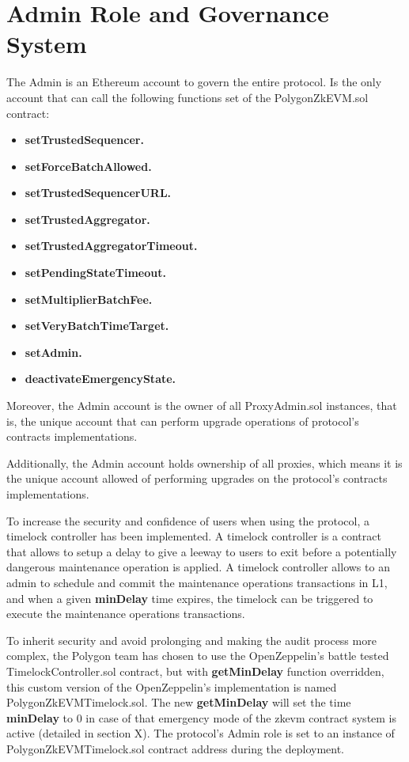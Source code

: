 \section{Admin Role and Governance System}

The Admin is an Ethereum account to govern the entire protocol. Is the only account that can call the following functions set of the PolygonZkEVM.sol contract:

\begin{itemize}
	\item \textbf{setTrustedSequencer.}
	\item \textbf{setForceBatchAllowed.}	
	\item \textbf{setTrustedSequencerURL.}
	\item \textbf{setTrustedAggregator.}
	\item \textbf{setTrustedAggregatorTimeout.}
	\item \textbf{setPendingStateTimeout.}
	\item \textbf{setMultiplierBatchFee.}
	\item \textbf{setVeryBatchTimeTarget.}
	\item \textbf{setAdmin.}
	\item \textbf{deactivateEmergencyState.} 
\end{itemize}

Moreover, the Admin account is the owner of all ProxyAdmin.sol instances, that is, the unique account that can perform upgrade operations of protocol's contracts implementations.

Additionally, the Admin account holds ownership of all proxies, which means it is the unique account allowed of performing upgrades on the protocol's contracts implementations.

To increase the security and confidence of users when using the protocol, a timelock controller has been implemented. A timelock controller is a contract that allows to setup a delay to give a leeway to users to exit before a potentially dangerous maintenance operation is applied. A timelock controller allows to an admin to schedule and commit the maintenance operations transactions in L1, and when a given \textbf{minDelay} time expires, the timelock can be triggered to execute the maintenance operations transactions.

To inherit security and avoid prolonging and making the audit process more complex, the Polygon team has chosen to use the OpenZeppelin's battle tested TimelockController.sol contract, but with \textbf{getMinDelay} function overridden, this custom version of the OpenZeppelin's implementation is named PolygonZkEVMTimelock.sol. The new \textbf{getMinDelay}  will set the time \textbf{minDelay} to 0 in case of that emergency mode of the zkevm contract system is active (detailed in section X). The protocol's Admin role is set to an instance of PolygonZkEVMTimelock.sol contract address during the deployment. 

